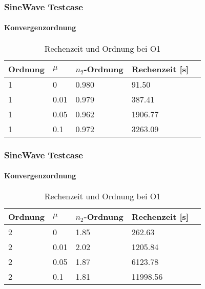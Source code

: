 \documentclass[
	11pt, %
	aspectratio=169, %
]{beamer}
\begin{document}



\begin{frame}
	\frametitle{SineWave Testcase}
	\framesubtitle{Konvergenzordnung}

		\begin{table}
			\begin{tabular}{l l l l l}
				\toprule
				Ordnung & $\mu$  & $n_2$-Ordnung & Rechenzeit [s]\\
				\midrule
				1 & 0 & 0.980 & 91.50\\
				1 & 0.01  & 0.979& 387.41\\
				1 & 0.05 &  0.962 & 1906.77\\
				1 & 0.1 &  0.972  & 3263.09\\
				\bottomrule
			\end{tabular}
			\caption{Rechenzeit und Ordnung bei O1}
	\end{table}


\end{frame}



\begin{frame}
	\frametitle{SineWave Testcase}
	\framesubtitle{Konvergenzordnung}

		\begin{table}
			\begin{tabular}{l l l l l}
				\toprule
				Ordnung & $\mu$  & $n_2$-Ordnung & Rechenzeit [s]\\
				\midrule
				2 & 0 &  1.85 &262.63 \\
				2 & 0.01 &2.02 &1205.84 \\
				2 & 0.05  & 1.87& 6123.78 \\
				2 & 0.1 &  1.81& 11998.56\\
				\bottomrule
			\end{tabular}
			\caption{Rechenzeit und Ordnung bei O1}
	\end{table}


\end{frame}
\end{document}
